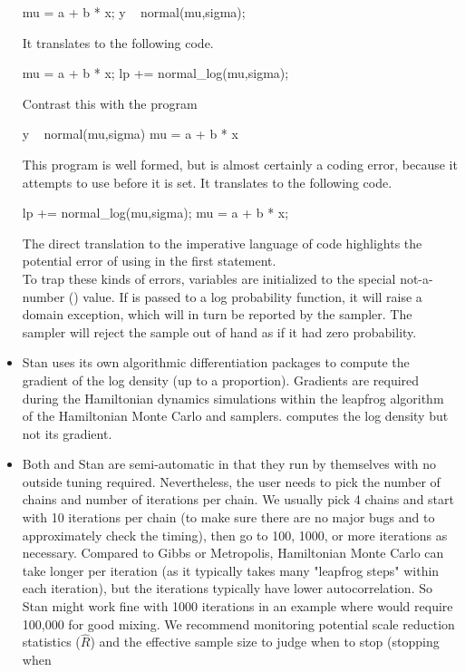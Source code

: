 \begin{itemize}
\begin{stancode}
mu = a + b * x;
y ~ normal(mu,sigma);
\end{stancode}
%
It translates to the following \Cpp code.
%
\begin{stancode}
mu = a + b * x; 
lp += normal_log(mu,sigma);
\end{stancode}
%
Contrast this with the \Stan program
%
\begin{stancode}
y ~ normal(mu,sigma)
mu = a + b * x
\end{stancode}
%
This program is well formed, but is almost certainly  
a coding error, because it attempts to use  before 
it is set. It translates to the following \Cpp code.
%
\begin{stancode}
lp += normal_log(mu,sigma);
mu = a + b * x;
\end{stancode}
%
The direct translation to the imperative language of \Cpp code
highlights the potential error of using  in the first
statement.
\\[8pt]
To trap these kinds of errors, variables are initialized to the
special not-a-number () value.  If  is passed to a
log probability function, it will raise a domain exception, which will
in turn be reported by the sampler.  The sampler will reject the
sample out of hand as if it had zero probability.
%
\item Stan uses its own \Cpp algorithmic differentiation packages to
  compute the gradient of the log density (up to a proportion).
  Gradients are required during the Hamiltonian dynamics simulations
  within the leapfrog algorithm of the Hamiltonian Monte Carlo and
  \NUTS samplers.  \BUGS computes the log density but not its
  gradient.
\item Both \BUGS and Stan are semi-automatic in that they run by
  themselves with no outside tuning required. Nevertheless, the user
  needs to pick the number of chains and number of iterations per
  chain.  We usually pick 4 chains and start with 10 iterations per
  chain (to make sure there are no major bugs and to approximately
  check the timing), then go to 100, 1000, or more iterations as
  necessary.  Compared to Gibbs or Metropolis, Hamiltonian Monte Carlo
  can take longer per iteration (as it typically takes many "leapfrog
  steps" within each iteration), but the iterations typically have lower
  autocorrelation.  So Stan might work fine with 1000 iterations in an
  example where \BUGS would require 100,000 for good mixing.  We 
  recommend monitoring potential scale reduction statistics ($\hat{R}$)
  and the effective sample size to judge when to stop (stopping when

\end{itemize}
